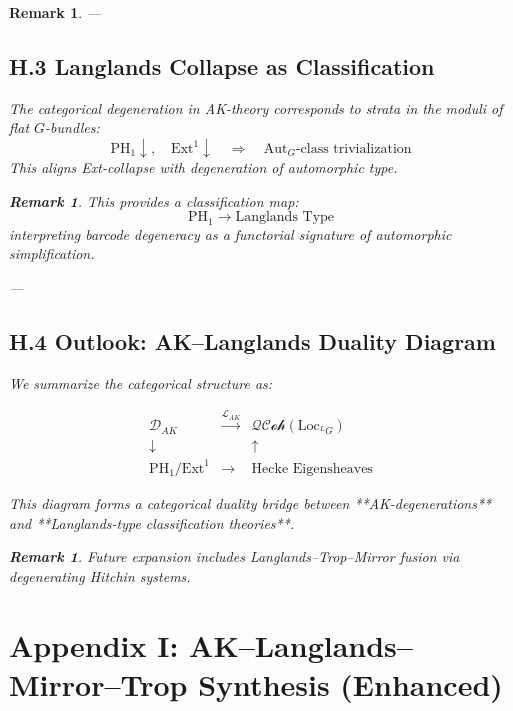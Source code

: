 \documentclass[11pt]{article}
\newtheorem{remark}[theorem]{Remark}
\begin{document}
\begin{remark}
---

\subsection*{H.3 Langlands Collapse as Classification}

\begin{proposition}
The categorical degeneration in AK-theory corresponds to strata in the moduli of flat \( G \)-bundles:
\[
\text{PH}_1 \downarrow,\quad \mathrm{Ext}^1 \downarrow \quad \Rightarrow \quad \mathrm{Aut}_G\text{-class trivialization}
\]
This aligns Ext-collapse with degeneration of automorphic type.
\end{proposition}

\begin{remark}
This provides a classification map:
\[
\mathrm{PH}_1 \to \text{Langlands Type}
\]
interpreting barcode degeneracy as a functorial signature of automorphic simplification.
\end{remark}

---

\subsection*{H.4 Outlook: AK–Langlands Duality Diagram}

We summarize the categorical structure as:

\[
\begin{array}{ccc}
\mathcal{D}_{AK} & \xrightarrow{\mathcal{L}_{AK}} & \mathcal{QCoh}(\mathrm{Loc}_{^LG}) \\
\downarrow & & \uparrow \\
\mathrm{PH}_1 / \mathrm{Ext}^1 & \longrightarrow & \text{Hecke Eigensheaves}
\end{array}
\]

This diagram forms a categorical duality bridge  
between **AK-degenerations** and **Langlands-type classification theories**.

\begin{remark}
Future expansion includes Langlands–Trop–Mirror fusion via degenerating Hitchin systems.
\end{remark}



\section*{Appendix I: AK–Langlands–Mirror–Trop Synthesis (Enhanced)}


\end{remark}
\end{document}
